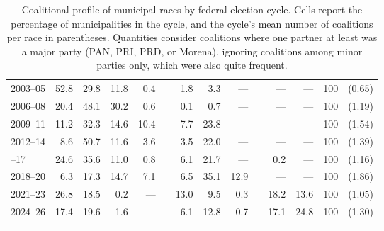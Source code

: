 \documentclass[letter,12pt]{article}
\begin{document}
\begin{table}
{\begin{tabular}{lrrrrrrrrrrrrc}
 2003--05&  52.8&  29.8&   11.8&    0.4&&    1.8&       3.3&         ---&&  ---&       ---& 100 & (0.65) \\
 2006--08&  20.4&  48.1&   30.2&    0.6&&    0.1&       0.7&         ---&&  ---&       ---& 100 & (1.19) \\
 2009--11&  11.2&  32.3&   14.6&   10.4&&    7.7&      23.8&         ---&&  ---&       ---& 100 & (1.54) \\
 2012--14&   8.6&  50.7&   11.6&    3.6&&    3.5&      22.0&         ---&&  ---&       ---& 100 & (1.39) \\ \hdashline
 2015--17&  24.6&  35.6&   11.0&    0.8&&    6.1&      21.7&         ---&&  0.2&       ---& 100 & (1.16) \\
 2018--20&   6.3&  17.3&   14.7&    7.1&&    6.5&      35.1&        12.9&&  ---&       ---& 100 & (1.86) \\
 2021--23&  26.8&  18.5&    0.2&    ---&&   13.0&       9.5&         0.3&& 18.2&      13.6& 100 & (1.05) \\
 2024--26&  17.4&  19.6&    1.6&    ---&&    6.1&      12.8&         0.7&& 17.1&      24.8& 100 & (1.30) \\ 
         &      &      &       &       &&       &          &            &&     &          &       &        \\ [-1.8ex] 
  \hline
\end{tabular}
}
\caption{Coalitional profile of municipal races by federal election cycle. Cells report the percentage of municipalities in the cycle, and the cycle's mean number of coalitions per race in parentheses. Quantities consider coalitions where one partner at least was a major party (PAN, PRI, PRD, or Morena), ignoring coalitions among minor parties only, which were also quite frequent.}\label{T:coal}
\end{table}
\end{document}
